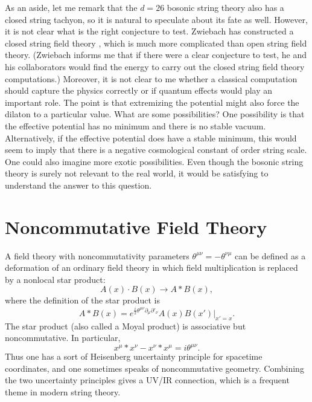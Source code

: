 \documentclass[a4paper,12pt]{article}
\begin{document}
As an aside, let me remark that the $d=26$ bosonic string theory
also has a closed string tachyon, so it is natural to speculate
about its fate as well. However, it is not clear what is the right
conjecture to test.  Zwiebach has constructed a closed
string field theory \cite{BZ}, which is much more complicated
than open string field theory.  (Zwiebach informs me that if there were
a clear conjecture to test, he and his collaborators would find the energy to
carry out the closed string field theory computations.)
Moreover, it is not clear
to me
whether a classical computation should capture the physics
correctly or if quantum effects would play an important role. 
The point is that extremizing the potential might also force the
dilaton to a particular value. What
are some possibilities?  One possibility is that the effective
potential has no minimum and there is no stable vacuum.
Alternatively, if the effective potential does have a stable
minimum, this would seem to imply that there is a negative
cosmological constant of order string scale. One could also
imagine more exotic possibilities. Even though the bosonic string
theory is surely not relevant to the real world, it would be
satisfying to understand the answer to this question.

\section{Noncommutative Field Theory}

A field theory with noncommutativity parameters $\theta^{\mu\nu} =
- \theta^{\nu\mu}$ can be defined as a deformation of an ordinary
field theory in which field multiplication is replaced by a
nonlocal star product:
\begin{equation}
A(x) \cdot B(x) \rightarrow A * B (x),
\end{equation}
where the definition of the star product is
\begin{equation}
A * B (x) = e^{\frac{i}{2} \theta^{\mu\nu} \partial_{\mu}
\partial'_{\nu}} A (x) B (x') |_{x' = x}.
\end{equation}
The star product (also called a Moyal product) is associative but
noncommutative. In particular,
\begin{equation}
x^\mu * x^\nu - x^\nu * x^\mu = i \theta^{\mu\nu}.
\end{equation}
Thus one has a sort of Heisenberg uncertainty principle for
spacetime coordinates, and one sometimes speaks of noncommutative
geometry. Combining the two uncertainty principles gives a UV/IR
connection, which is a frequent theme in modern string theory.
\end{document}
